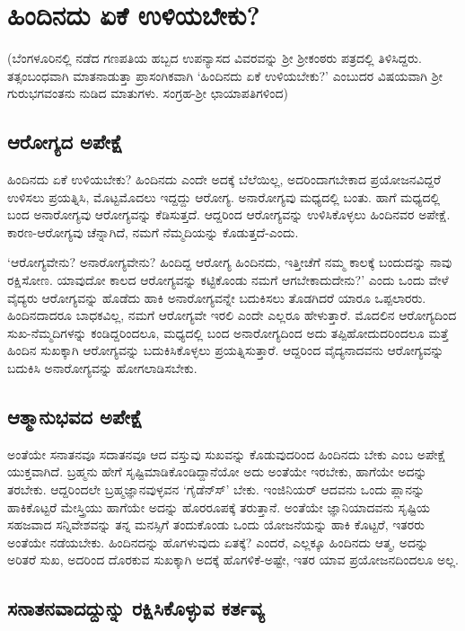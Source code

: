 \chapter{ಹಿಂದಿನದು ಏಕೆ ಉಳಿಯಬೇಕು?} 

(ಬೆಂಗಳೂರಿನಲ್ಲಿ ನಡೆದ ಗಣಪತಿಯ ಹಬ್ಬದ ಉಪನ್ಯಾಸದ ವಿವರವನ್ನು ಶ್ರೀ ಶ್ರೀಕಂಠರು ಪತ್ರದಲ್ಲಿ ತಿಳಿಸಿದ್ದರು. ತತ್ಸಂಬಂಧವಾಗಿ ಮಾತನಾಡುತ್ತಾ ಪ್ರಾಸಂಗಿಕವಾಗಿ `ಹಿಂದಿನದು ಏಕೆ ಉಳಿಯಬೇಕು?' ಎಂಬುದರ ವಿಷಯವಾಗಿ ಶ್ರೀ ಗುರುಭಗವಂತನು ನುಡಿದ ಮಾತುಗಳು. ಸಂಗ್ರಹ-ಶ್ರೀ ಛಾಯಾಪತಿಗಳಿಂದ) 

\section*{ಆರೋಗ್ಯದ ಅಪೇಕ್ಷೆ}

ಹಿಂದಿನದು ಏಕೆ ಉಳಿಯಬೇಕು? ಹಿಂದಿನದು ಎಂದೇ ಅದಕ್ಕೆ ಬೆಲೆಯಿಲ್ಲ, ಅದರಿಂದಾಗಬೇಕಾದ ಪ್ರಯೋಜನವಿದ್ದರೆ ಉಳಿಸಲು ಪ್ರಯತ್ನಿಸಿ, ಮೊಟ್ಟಮೊದಲು ಇದ್ದದ್ದು ಆರೋಗ್ಯ. ಅನಾರೋಗ್ಯವು ಮಧ್ಯದಲ್ಲಿ ಬಂತು. ಹಾಗೆ ಮಧ್ಯದಲ್ಲಿ ಬಂದ ಅನಾರೋಗ್ಯವು ಆರೋಗ್ಯವನ್ನು ಕೆಡಿಸುತ್ತದೆ. ಆದ್ದರಿಂದ ಆರೋಗ್ಯವನ್ನು ಉಳಿಸಿಕೊಳ್ಳಲು ಹಿಂದಿನವರ ಅಪೇಕ್ಷೆ. ಕಾರಣ-ಆರೋಗ್ಯವು ಚೆನ್ನಾಗಿದೆ, ನಮಗೆ ನೆಮ್ಮದಿಯನ್ನು ಕೊಡುತ್ತದೆ-ಎಂದು. 

`ಆರೋಗ್ಯವೇನು? ಅನಾರೋಗ್ಯವೇನು? ಹಿಂದಿದ್ದ ಆರೋಗ್ಯ ಹಿಂದಿನದು, ಇತ್ತೀಚೆಗೆ ನಮ್ಮ ಕಾಲಕ್ಕೆ ಬಂದುದನ್ನು ನಾವು ರಕ್ಷಿಸೋಣ. ಯಾವುದೋ ಕಾಲದ ಆರೋಗ್ಯವನ್ನು ಕಟ್ಟಿಕೊಂಡು ನಮಗೆ ಆಗಬೇಕಾದುದೇನು?' ಎಂದು ಒಂದು ವೇಳೆ ವೈದ್ಯರು ಆರೋಗ್ಯವನ್ನು ಹೊಡೆದು ಹಾಕಿ ಅನಾರೋಗ್ಯವನ್ನೇ ಬದುಕಿಸಲು ತೊಡಗಿದರೆ ಯಾರೂ ಒಪ್ಪಲಾರರು. ಹಿಂದಿನದಾದರೂ ಬಾಧಕವಿಲ್ಲ, ನಮಗೆ ಆರೋಗ್ಯವೇ ಇರಲಿ ಎಂದೇ ಎಲ್ಲರೂ ಹೇಳುತ್ತಾರೆ. ಮೊದಲಿನ ಆರೋಗ್ಯದಿಂದ ಸುಖ-ನೆಮ್ಮದಿಗಳನ್ನು ಕಂಡಿದ್ದರಿಂದಲೂ, ಮಧ್ಯದಲ್ಲಿ ಬಂದ ಅನಾರೋಗ್ಯದಿಂದ ಅದು ತಪ್ಪಿಹೋದುದರಿಂದಲೂ ಮತ್ತೆ ಹಿಂದಿನ ಸುಖಕ್ಕಾಗಿ ಆರೋಗ್ಯವನ್ನು ಬದುಕಿಸಿಕೊಳ್ಳಲು ಪ್ರಯತ್ನಿಸುತ್ತಾರೆ. ಆದ್ದರಿಂದ ವೈದ್ಯನಾದವನು ಆರೋಗ್ಯವನ್ನು ಬದುಕಿಸಿ ಅನಾರೋಗ್ಯವನ್ನು ಹೋಗಲಾಡಿಸಬೇಕು. 

\section*{ಆತ್ಮಾನುಭವದ ಅಪೇಕ್ಷೆ}

ಅಂತೆಯೇ ಸನಾತನವೂ ಸದಾತನವೂ ಆದ ವಸ್ತುವು ಸುಖವನ್ನು ಕೊಡುವುದರಿಂದ ಹಿಂದಿನದು ಬೇಕು ಎಂಬ ಅಪೇಕ್ಷೆ ಯುಕ್ತವಾಗಿದೆ. ಬ್ರಹ್ಮನು ಹೇಗೆ ಸೃಷ್ಟಿಮಾಡಿಕೊಂಡಿದ್ದಾನೆಯೋ ಅದು ಅಂತೆಯೇ ಇರಬೇಕು, ಹಾಗೆಯೇ ಅದನ್ನು ತರಬೇಕು. ಆದ್ದರಿಂದಲೇ ಬ್ರಹ್ಮಜ್ಞಾನವುಳ್ಳವನ `ಗೈಡೆನ್ಸ್‍' ಬೇಕು. ಇಂಜಿನಿಯರ್‍ ಆದವನು ಒಂದು ಪ್ಲಾನನ್ನು ಹಾಕಿಕೊಟ್ಟರೆ ಮೇಸ್ತ್ರಿಯು ಹಾಗೆಯೇ ಅದನ್ನು ಹೊರರೂಪಕ್ಕೆ ತರುತ್ತಾನೆ. ಅಂತೆಯೇ ಜ್ಞಾನಿಯಾದವನು ಸೃಷ್ಟಿಯ ಸಹಜವಾದ ಸನ್ನಿವೇಶವನ್ನು ತನ್ನ ಮನಸ್ಸಿಗೆ ತಂದುಕೊಂಡು ಒಂದು ಯೋಜನೆಯನ್ನು ಹಾಕಿ ಕೊಟ್ಟರೆ, ಇತರರು ಅಂತೆಯೇ ನಡೆಯಬೇಕು. ಹಿಂದಿನದನ್ನು ಹೊಗಳುವುದು ಏತಕ್ಕೆ? ಎಂದರೆ, ಎಲ್ಲಕ್ಕೂ ಹಿಂದಿನದು ಆತ್ಮ, ಅದನ್ನು ಅರಿತರೆ ಸುಖ, ಅದರಿಂದ ದೊರಕುವ ಸುಖಕ್ಕಾಗಿ ಅದಕ್ಕೆ ಹೊಗಳಿಕೆ-ಅಷ್ಟೇ, ಇತರ ಯಾವ ಪ್ರಯೋಜನದಿಂದಲೂ ಅಲ್ಲ. 

\section*{ಸನಾತನವಾದದ್ದುನ್ನು ರಕ್ಷಿಸಿಕೊಳ್ಳುವ ಕರ್ತವ್ಯ}

